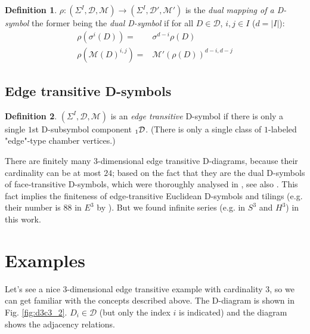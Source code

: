 \documentclass[12pt,a4paper]{article}
\numberwithin{equation}{section}
\newcommand{\leftsub}[2]{{\vphantom{#2}}_{#1}{#2}}
\theoremstyle{plain}%
\newtheorem{prop}[thm]{Proposition}
\theoremstyle{definition}
\newtheorem{defn}{Definition}[section]
\theoremstyle{remark}
\begin{document}
\begin{defn}
  $\rho: (\Sigma^I,\mathcal{D},\mathcal{M}) \rightarrow
  (\Sigma^I,\mathcal{D}',\mathcal{M}')$ is the {\em dual mapping of a D-symbol}
  the former being the {\em dual D-symbol} if for all $D\in \mathcal{D}$, $i,j
  \in I$ ($d=|I|$):
  \begin{align}
    \rho(\sigma^i(D))= & \sigma^{d-i}\rho(D) \\
    \rho(\mathcal{M}(D)^{i,j})= & \mathcal{M}'(\rho(D))^{d-i,d-j}
  \end{align}
\end{defn}


\subsection{Edge transitive D-symbols}
\label{sec:edge_transitive}

\begin{defn}
  $(\Sigma^I,\mathcal{D},\mathcal{M})$ is an {\em edge transitive} D-symbol if
  there is only a single $1$st D-subsymbol component $\leftsub{1}{\mathcal{D}}$. (There is only a single class of
  $1$-labeled "edge"-type chamber vertices.)
\end{defn}

There are finitely many $3$-dimensional edge transitive D-diagrams, because their
cardinality can be at most $24$; based on the fact that they are the dual
D-symbols of face-transitive D-symbols, which were thoroughly analysed in
\cite{DHM93}, see also \cite{DDH98}. This fact implies the finiteness of edge-transitive
Euclidean D-symbols and tilings (e.g. their number is $88$ in $E^3$ by
\cite{DHM93}). But we found infinite series (e.g. in $S^3$ and $H^3$) in this work.

\section{Examples}

Let's see a nice $3$-dimensional edge transitive example with cardinality $3$,
so we can get familiar with the concepts described above. The D-diagram is shown
in Fig.  \ref{fig:d3c3_2}. $D_i\in \mathcal{D}$ (but only the index $i$ is
indicated) and the diagram shows the adjacency relations.
\end{document}
